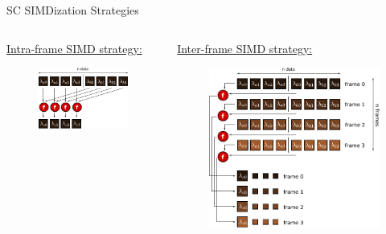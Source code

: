 \begin{frame}{SC SIMDization Strategies}
  \begin{columns}[t]
    \begin{column}[T]{6.0cm}
      \underline{Intra-frame SIMD strategy:}
      \begin{figure}[htp]
        \centering
        \includegraphics[scale=0.625]{figs/intra-simd}
        \label{fig:intra-simd}
      \end{figure}
    \end{column}
    \begin{column}[T]{6.0cm}
      \underline{Inter-frame SIMD strategy:}
      \begin{figure}[htp]
        \centering
        \includegraphics[scale=0.625]{figs/inter-simd}
        \label{fig:inter-simd}
      \end{figure}
    \end{column}
  \end{columns}
\end{frame}

